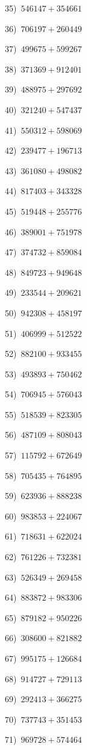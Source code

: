 \documentclass{article}
\begin{document}
\begin{multicols}{2}
35)$\,\,\,546147+354661$ \par 
36)$\,\,\,706197+260449$ \par 
37)$\,\,\,499675+599267$ \par 
38)$\,\,\,371369+912401$ \par 
39)$\,\,\,488975+297692$ \par 
40)$\,\,\,321240+547437$ \par 
41)$\,\,\,550312+598069$ \par 
42)$\,\,\,239477+196713$ \par 
43)$\,\,\,361080+498082$ \par 
44)$\,\,\,817403+343328$ \par 
45)$\,\,\,519448+255776$ \par 
46)$\,\,\,389001+751978$ \par 
47)$\,\,\,374732+859084$ \par 
48)$\,\,\,849723+949648$ \par 
49)$\,\,\,233544+209621$ \par 
50)$\,\,\,942308+458197$ \par 
51)$\,\,\,406999+512522$ \par 
52)$\,\,\,882100+933455$ \par 
53)$\,\,\,493893+750462$ \par 
54)$\,\,\,706945+576043$ \par 
55)$\,\,\,518539+823305$ \par 
56)$\,\,\,487109+808043$ \par 
57)$\,\,\,115792+672649$ \par 
58)$\,\,\,705435+764895$ \par 
59)$\,\,\,623936+888238$ \par 
60)$\,\,\,983853+224067$ \par 
61)$\,\,\,718631+622024$ \par 
62)$\,\,\,761226+732381$ \par 
63)$\,\,\,526349+269458$ \par 
64)$\,\,\,883872+983306$ \par 
65)$\,\,\,879182+950226$ \par 
66)$\,\,\,308600+821882$ \par 
67)$\,\,\,995175+126684$ \par 
68)$\,\,\,914727+729113$ \par 
69)$\,\,\,292413+366275$ \par 
70)$\,\,\,737743+351453$ \par 
71)$\,\,\,969728+574464$ \par 

\end{multicols}
\end{document}
